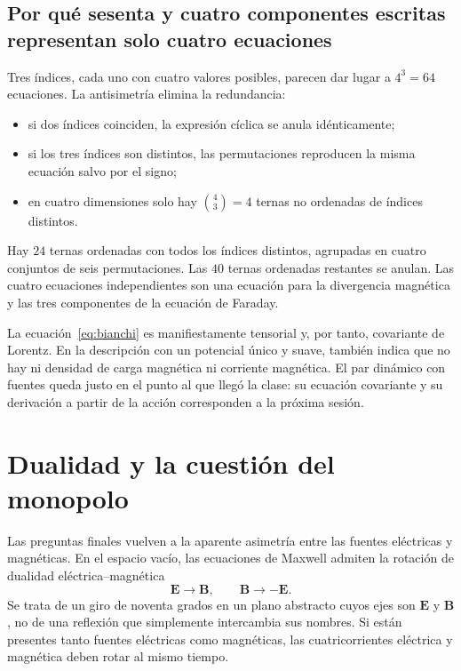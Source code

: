 \subsection{Por qué sesenta y cuatro componentes escritas representan solo cuatro ecuaciones}

Tres índices, cada uno con cuatro valores posibles, parecen dar lugar a \(4^3=64\) ecuaciones. La antisimetría elimina la redundancia:
\begin{itemize}
\item si dos índices coinciden, la expresión cíclica se anula idénticamente;
\item si los tres índices son distintos, las permutaciones reproducen la misma ecuación salvo por el signo;
\item en cuatro dimensiones solo hay \(\binom{4}{3}=4\) ternas no ordenadas de índices distintos.
\end{itemize}
Hay \(24\) ternas ordenadas con todos los índices distintos, agrupadas en cuatro conjuntos de seis permutaciones. Las \(40\) ternas ordenadas restantes se anulan. Las cuatro ecuaciones independientes son una ecuación para la divergencia magnética y las tres componentes de la ecuación de Faraday.

\begin{classroomqa}
\end{classroomqa}

La ecuación~\eqref{eq:bianchi} es manifiestamente tensorial y, por tanto, covariante de Lorentz. En la descripción con un potencial único y suave, también indica que no hay ni densidad de carga magnética ni corriente magnética. El par dinámico con fuentes queda justo en el punto al que llegó la clase: su ecuación covariante y su derivación a partir de la acción corresponden a la próxima sesión.

\section{Dualidad y la cuestión del monopolo}

Las preguntas finales vuelven a la aparente asimetría entre las fuentes eléctricas y magnéticas. En el espacio vacío, las ecuaciones de Maxwell admiten la rotación de dualidad eléctrica--magnética
\begin{equation}
\mathbf E\longrightarrow\mathbf B,
\qquad
\mathbf B\longrightarrow-\mathbf E.
\label{eq:duality-quarter-turn}
\end{equation}
Se trata de un giro de noventa grados en un plano abstracto cuyos ejes son \(\mathbf E\) y \(\mathbf B\), no de una reflexión que simplemente intercambia sus nombres. Si están presentes tanto fuentes eléctricas como magnéticas, las cuatricorrientes eléctrica y magnética deben rotar al mismo tiempo.

